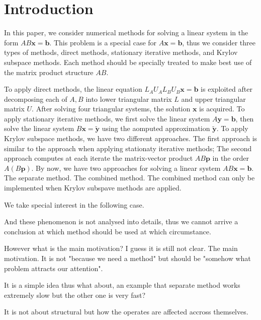 \section{Introduction}
In this paper, we consider numerical methods for solving a linear system in the form $AB \bm{x} = \bm{b}$.
This problem is a special case for $A \bm{x} = \bm{b}$, thus we consider three types of methods, direct methods, stationary iterative methods, and Krylov subspace methods.
Each method should be specially treated to make best use of the matrix product structure $AB$.

To apply direct methods, the linear equation ${L}_{A} {U}_{A} {L}_{B} {U}_{B} \bm{x} = \bm{b}$ is exploited
after decomposing each of $A , B$ into lower triangular matrix ${L}$ and upper triangular matrix ${U}$.
After solving four triangular systems, the solution $\bm{x}$ is acquired.
To apply stationary iterative methods, we first solve the linear system $A \bm{y} = \bm{b}$, then solve the linear system $B \bm{x} = \tilde{\bm{y}}$ using the aomputed approximation $\tilde{\bm{y}}$.
To apply Krylov subspace methods, we have two different approaches. The first approach is similar to the approach when applying stationaty iterative methods; The second approach computes at each iterate the matrix-vector product $AB\bm{p}$ in the order $A (B\bm{p})$.
By now, we have two approaches for solving a linear system $AB \bm{x} = \bm{b}$. The separate method. The combined method. The combined method can only be implemented when Krylov subspave methods are applied.

We take special interest in the following case.

And these phenomenon is not analysed into details, thus we cannot arrive a conclusion at which method should be used at which circumstance.

However what is the main motivation? I guess it is still not clear. The main motivation. It is not "because we need a method" but should be "somehow what problem attracts our attention".

It is a simple idea thus what about, an example that separate method works extremely slow but the other one is very fast?

It is not about structural but how the operates are affected accross themselves.

